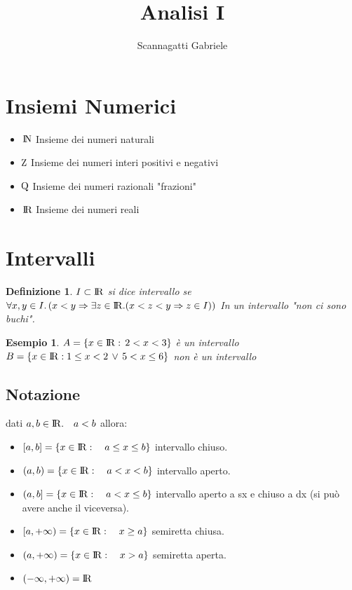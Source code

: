 \documentclass[12pt, a4paper]{article}
\title{Analisi I}
\author{Scannagatti Gabriele}
\theoremstyle{break}
\newtheorem{definition}{Definizione}[subsection]
\newtheorem{example}{Esempio}[subsection]
\newcommand\R{{\rm I\!R}}
\begin{document}
\maketitle
\newpage
    \section{Insiemi Numerici}
    \begin{itemize}
        \item ${\rm I\!N}$ Insieme dei numeri naturali
        \item ${\rm \!Z}$ Insieme dei numeri interi positivi e negativi
        \item ${\rm \!Q}$ Insieme dei numeri razionali "frazioni"
        \item $\R$ Insieme dei numeri reali
    \end{itemize}
    \section{Intervalli}
    \begin{definition}
        $I\subset \R$ si dice intervallo se $\forall x,y\in I.\,(x<y\Rightarrow \exists z\in \R.(x<z<y\Rightarrow z\in I))$
        \newline
        In un intervallo "non ci sono buchi".
    \end{definition}
    \begin{example}
        $A = \{x\in \R :\, 2<x<3\}$ è un intervallo \newline
        $B = \{x\in \R: 1\leq x < 2\, \vee\, 5<x\leq6\}$ non è un intervallo        
    \end{example}
    \subsection{Notazione}
    dati $a,b\in \R.\quad a<b$ allora:
    \begin{itemize}
        \item $[a,b] = \{x\in\R:\quad a\leq x\leq b\}$ intervallo chiuso.
        \item $(a,b) = \{x\in\R:\quad a<x<b\}$ intervallo aperto.
        \item $(a,b] = \{x\in\R:\quad a<x\leq b\}$ intervallo aperto a sx e chiuso a dx (si può avere anche il viceversa).
        \item $[a,+\infty) = \{x\in\R:\quad x\geq a\}$ semiretta chiusa.
        \item $(a, +\infty) = \{x\in\R:\quad x > a\}$ semiretta aperta.
        \item $(-\infty,+\infty) = \R$
    \end{itemize}
    \newpage
\end{document}
